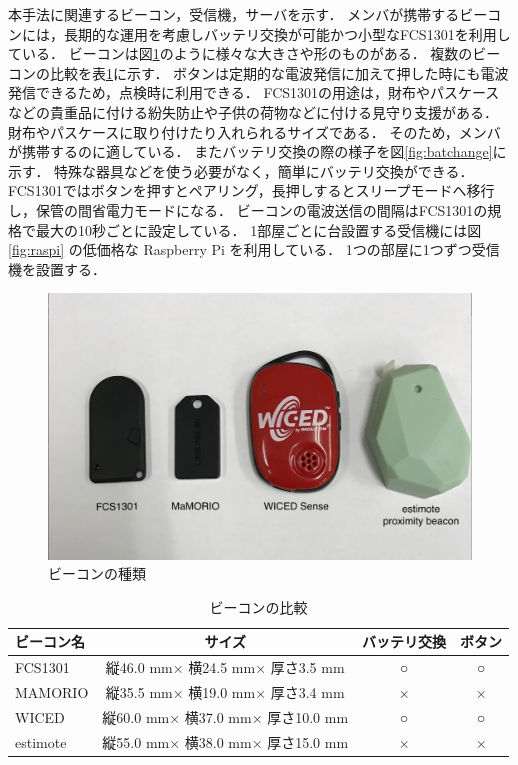 本手法に関連するビーコン，受信機，サーバを示す．
メンバが携帯するビーコンには，長期的な運用を考慮しバッテリ交換が可能かつ小型なFCS1301\cite{fcs1301}を利用している．
ビーコンは図\ref{fig:beacons}のように様々な大きさや形のものがある．
複数のビーコンの比較を表\ref{tb:beacons}に示す．
ボタンは定期的な電波発信に加えて押した時にも電波発信できるため，点検時に利用できる．
FCS1301の用途は，財布やパスケースなどの貴重品に付ける紛失防止や子供の荷物などに付ける見守り支援がある．
財布やパスケースに取り付けたり入れられるサイズである．
そのため，メンバが携帯するのに適している．
またバッテリ交換の際の様子を図\ref{fig:batchange}に示す．
特殊な器具などを使う必要がなく，簡単にバッテリ交換ができる．
FCS1301ではボタンを押すとペアリング，長押しするとスリープモードへ移行し，保管の間省電力モードになる．
ビーコンの電波送信の間隔はFCS1301の規格で最大の10秒ごとに設定している．
1部屋ごとに台設置する受信機には図\ref{fig:raspi} の低価格な Raspberry Pi\cite{raspi} を利用している．
1つの部屋に1つずつ受信機を設置する．

\begin{figure}[H]
  \begin{center}
    \includegraphics[width=150mm]{image/beaconType.jpg}
    \caption{ビーコンの種類}
    \label{fig:beacons}
  \end{center}
\end{figure}

\begin{table}[H]
  \begin{center}
    \caption{ビーコンの比較}
    \label{tb:beacons}
    \begin{tabular}{|l|c|c|c|} \hline
      ビーコン名    & サイズ                           & バッテリ交換 & ボタン \\ \hline \hline
      FCS1301  & 縦46.0 mm× 横24.5 mm× 厚さ3.5 mm  & ○      & ○   \\
      MAMORIO  & 縦35.5 mm× 横19.0 mm× 厚さ3.4 mm  & ×      & ×   \\
      WICED    & 縦60.0 mm× 横37.0 mm× 厚さ10.0 mm & ○      & ○   \\
      estimote & 縦55.0 mm× 横38.0 mm× 厚さ15.0 mm & ×      & ×   \\\hline
    \end{tabular}
  \end{center}
\end{table}

